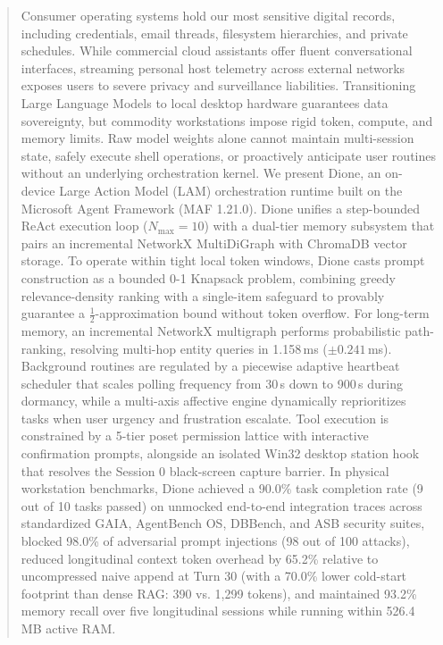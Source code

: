 \documentclass[conference,a4paper]{IEEEtran}
\begin{document}
\begin{abstract}
Consumer operating systems hold our most sensitive digital records, including credentials, email threads, filesystem hierarchies, and private schedules. While commercial cloud assistants offer fluent conversational interfaces, streaming personal host telemetry across external networks exposes users to severe privacy and surveillance liabilities. Transitioning Large Language Models to local desktop hardware guarantees data sovereignty, but commodity workstations impose rigid token, compute, and memory limits. Raw model weights alone cannot maintain multi-session state, safely execute shell operations, or proactively anticipate user routines without an underlying orchestration kernel. We present Dione, an on-device Large Action Model (LAM) orchestration runtime built on the Microsoft Agent Framework (MAF 1.21.0). Dione unifies a step-bounded ReAct execution loop ($N_{\text{max}} = 10$) with a dual-tier memory subsystem that pairs an incremental NetworkX MultiDiGraph with ChromaDB vector storage. To operate within tight local token windows, Dione casts prompt construction as a bounded 0-1 Knapsack problem, combining greedy relevance-density ranking with a single-item safeguard to provably guarantee a $\frac{1}{2}$-approximation bound without token overflow. For long-term memory, an incremental NetworkX multigraph performs probabilistic path-ranking, resolving multi-hop entity queries in 1.158\,ms ($\pm 0.241$\,ms). Background routines are regulated by a piecewise adaptive heartbeat scheduler that scales polling frequency from 30\,s down to 900\,s during dormancy, while a multi-axis affective engine dynamically reprioritizes tasks when user urgency and frustration escalate. Tool execution is constrained by a 5-tier poset permission lattice with interactive confirmation prompts, alongside an isolated Win32 desktop station hook that resolves the Session 0 black-screen capture barrier. In physical workstation benchmarks, Dione achieved a 90.0\% task completion rate (9 out of 10 tasks passed) on unmocked end-to-end integration traces across standardized GAIA, AgentBench OS, DBBench, and ASB security suites, blocked 98.0\% of adversarial prompt injections (98 out of 100 attacks), reduced longitudinal context token overhead by 65.2\% relative to uncompressed naive append at Turn 30 (with a 70.0\% lower cold-start footprint than dense RAG: 390 vs. 1,299 tokens), and maintained 93.2\% memory recall over five longitudinal sessions while running within 526.4\,MB active RAM.
\end{abstract}
\end{document}

